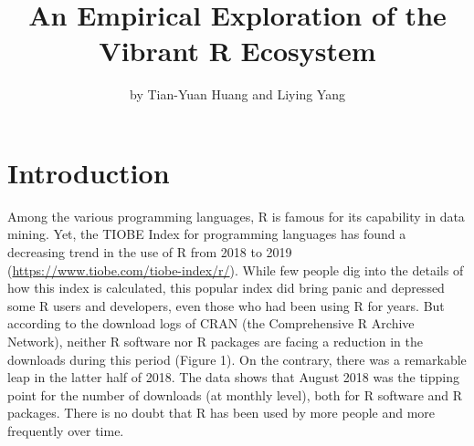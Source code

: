 \title{An Empirical Exploration of the Vibrant R Ecosystem}
\author{by Tian-Yuan Huang and Liying Yang}

\maketitle


\hypertarget{introduction}{%
\section{Introduction}\label{introduction}}

Among the various programming languages, R is famous for its capability
in data mining. Yet, the TIOBE Index for programming languages has found
a decreasing trend in the use of R from 2018 to 2019
(\url{https://www.tiobe.com/tiobe-index/r/}). While few people dig into
the details of how this index is calculated, this popular index did
bring panic and depressed some R users and developers, even those who
had been using R for years. But according to the download logs of CRAN
(the Comprehensive R Archive Network), neither R software nor R packages
are facing a reduction in the downloads during this period (Figure 1).
On the contrary, there was a remarkable leap in the latter half of 2018.
The data shows that August 2018 was the tipping point for the number of
downloads (at monthly level), both for R software and R packages. There
is no doubt that R has been used by more people and more frequently over
time.

